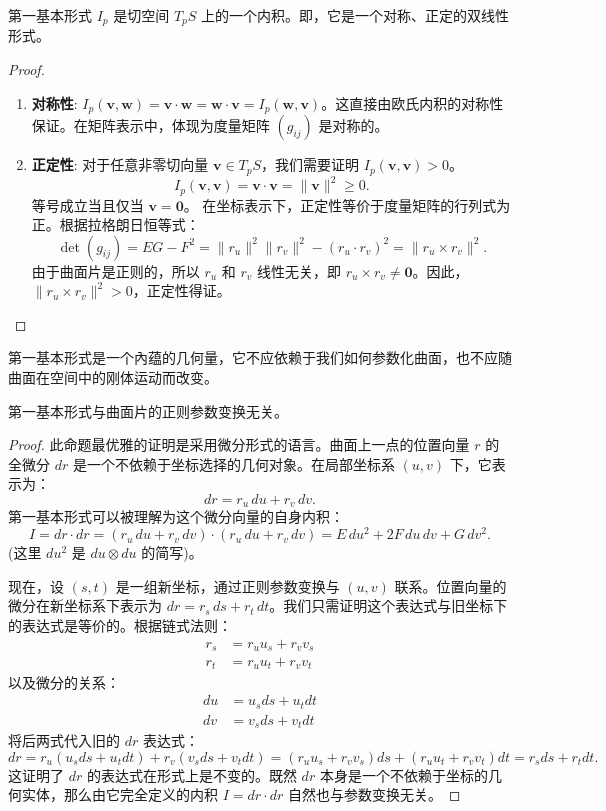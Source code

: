 \documentclass[lang=cn,10pt,thmcnt=section]{elegantbook}
\renewcommand{\vec}[1]{\mathbf{#1}}
\begin{document}
\begin{proposition}
    第一基本形式 $I_p$ 是切空间 $T_pS$ 上的一个内积。即，它是一个对称、正定的双线性形式。
\end{proposition}
\begin{proof}
    \begin{enumerate}
        \item \textbf{对称性}: $I_p(\vec{v}, \vec{w}) = \vec{v} \cdot \vec{w} = \vec{w} \cdot \vec{v} = I_p(\vec{w}, \vec{v})$。这直接由欧氏内积的对称性保证。在矩阵表示中，体现为度量矩阵 $(g_{ij})$ 是对称的。
        \item \textbf{正定性}: 对于任意非零切向量 $\vec{v} \in T_pS$，我们需要证明 $I_p(\vec{v}, \vec{v}) > 0$。
        \[
        I_p(\vec{v}, \vec{v}) = \vec{v} \cdot \vec{v} = \|\vec{v}\|^2 \ge 0.
        \]
        等号成立当且仅当 $\vec{v} = \vec{0}$。
        在坐标表示下，正定性等价于度量矩阵的行列式为正。根据拉格朗日恒等式：
        \[
        \det(g_{ij}) = EG - F^2 = \|r_u\|^2 \|r_v\|^2 - (r_u \cdot r_v)^2 = \|r_u \times r_v\|^2.
        \]
        由于曲面片是正则的，所以 $r_u$ 和 $r_v$ 线性无关，即 $r_u \times r_v \neq \vec{0}$。因此，$\|r_u \times r_v\|^2 > 0$，正定性得证。
    \end{enumerate}
\end{proof}

第一基本形式是一个內蕴的几何量，它不应依赖于我们如何参数化曲面，也不应随曲面在空间中的刚体运动而改变。

\begin{proposition}[参数变换下的不变性]
    第一基本形式与曲面片的正则参数变换无关。
\end{proposition}
\begin{proof}
    此命题最优雅的证明是采用微分形式的语言。曲面上一点的位置向量 $r$ 的全微分 $dr$ 是一个不依赖于坐标选择的几何对象。在局部坐标系 $(u,v)$ 下，它表示为：
    \[
    dr = r_u \, du + r_v \, dv.
    \]
    第一基本形式可以被理解为这个微分向量的自身内积：
    \[
    I = dr \cdot dr = (r_u \, du + r_v \, dv) \cdot (r_u \, du + r_v \, dv) = E \, du^2 + 2F \, du\,dv + G \, dv^2.
    \]
    (这里 $du^2$ 是 $du \otimes du$ 的简写)。

    现在，设 $(s,t)$ 是一组新坐标，通过正则参数变换与 $(u,v)$ 联系。位置向量的微分在新坐标系下表示为 $dr = r_s \, ds + r_t \, dt$。我们只需证明这个表达式与旧坐标下的表达式是等价的。根据链式法则：
    \begin{align*}
        r_s &= r_u u_s + r_v v_s \\
        r_t &= r_u u_t + r_v v_t
    \end{align*}
    以及微分的关系：
    \begin{align*}
        du &= u_s ds + u_t dt \\
        dv &= v_s ds + v_t dt
    \end{align*}
    将后两式代入旧的 $dr$ 表达式：
    \[
    dr = r_u(u_s ds + u_t dt) + r_v(v_s ds + v_t dt) = (r_u u_s + r_v v_s) ds + (r_u u_t + r_v v_t) dt = r_s ds + r_t dt.
    \]
    这证明了 $dr$ 的表达式在形式上是不变的。既然 $dr$ 本身是一个不依赖于坐标的几何实体，那么由它完全定义的内积 $I = dr \cdot dr$ 自然也与参数变换无关。
\end{proof}
\end{document}
